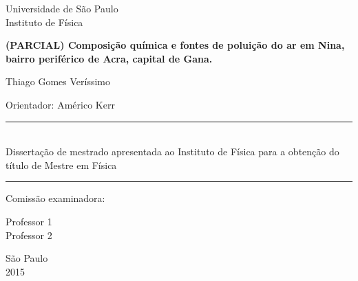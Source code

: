 \begin{titlepage}
\setlength{\voffset}{0pt}
\setlength{\hoffset}{0pt}
\centering
\Large{Universidade de São Paulo \\
Instituto de Física}

\LARGE{\bf (PARCIAL) Composição química e fontes de poluição do ar em Nina, bairro periférico de Acra, capital de Gana.
}


\Large{ Thiago Gomes Veríssimo
}


\begin{flushright}

\begin{minipage}{.6\textwidth}
\large{Orientador: Américo Kerr
}
\end{minipage}


\begin{minipage}{.6\textwidth}
\rule{\linewidth}{0.5mm}\\
\large{
Dissertação de mestrado apresentada ao Instituto de Física para a obtenção do 
título de Mestre em Física
}

\rule{\linewidth}{0.5mm}
\end{minipage}
\end{flushright}


\begin{flushleft}

\normalsize
Comissão examinadora:\\
\hspace{.03\textwidth}\begin{minipage}{.97\textwidth}
Professor 1 \\
Professor 2
\end{minipage}
\end{flushleft}


São Paulo\\
2015

\end{titlepage}

